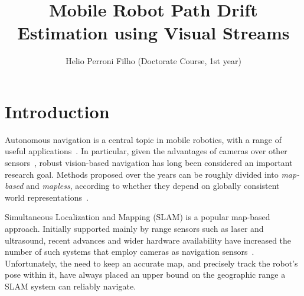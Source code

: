 \documentclass[twocolumn, 9pt,fleqn]{jsproceedings}
\title{Mobile Robot Path Drift Estimation using Visual Streams}
\author{Helio Perroni Filho (Doctorate Course, 1st year)\authorrefmark{1}}
\affiliation{Intelligent Robotics Laboratory, OHYA's group}
\begin{document}
\thispagestyle{myheadings}
\maketitle


\section{Introduction}

Autonomous navigation is a central topic in mobile robotics, with a range of useful applications~\cite{BON02,ARK90}. In particular, given the advantages of cameras over other sensors~\cite{BON02,DAV07}, robust vision-based navigation has long been considered an important research goal. Methods proposed over the years can be roughly divided into \textit{map-based} and \textit{mapless}, according to whether they depend on globally consistent world representations~\cite{BON02}.

Simultaneous Localization and Mapping (SLAM) is a popular map-based approach. Initially supported mainly by range sensors such as laser and ultrasound, recent advances and wider hardware availability have increased the number of such systems that employ cameras as navigation sensors~\cite{DAV07,CUM08}. Unfortunately, the need to keep an accurate map, and precisely track the robot's pose within it, have always placed an upper bound on the geographic range a SLAM system can reliably navigate.
\end{document}
